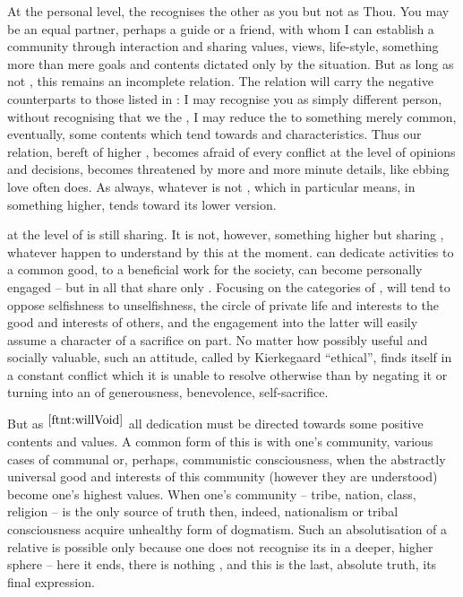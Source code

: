 \pa  %
At the personal level, the  recognises the other as you but
not as Thou.  You may be an equal partner, perhaps a guide or a friend, with
whom I can establish a community through interaction and sharing values, views,
life-style, something more than mere goals and contents dictated only by the
 situation. But as long as not , this remains
an incomplete relation.
The relation will carry the negative counterparts to those listed in
: I may recognise you as simply different person,
without recognising that we  the , I may reduce the
 to something merely common, eventually, some  contents
which tend towards  and  characteristics.  Thus our
relation, bereft of higher , becomes afraid of every conflict at
the level of  opinions and decisions, becomes threatened by more and
more minute details, like ebbing love often does. As always, whatever is not
, which in particular means,  in something
higher, tends toward its lower version.


{} at the level of  is still sharing. It is
not, however,  something higher but sharing , whatever
 happen to understand by this at the moment.  can dedicate 
activities to a common good, to a beneficial work for the society,  can
become personally engaged -- but in all that  share only .  Focusing
on the categories of ,  will tend to oppose selfishness to
unselfishness, the circle of  private life and interests to the good and
interests of others, and the engagement into the latter will easily assume a
character of a sacrifice on  part. No matter how possibly useful and
socially valuable, such an attitude, called by Kierkegaard ``ethical'', finds
itself in a constant conflict which it is unable to resolve otherwise than by
negating it or turning  into an  of 
generousness,  benevolence,  self-sacrifice.

But as $^{\ref{ftnt:willVoid}}$ all 
dedication must be directed 
towards some positive contents and values. 
A common form of this is  with one's 
community, various cases of communal or, perhaps, communistic
consciousness, when  the abstractly universal good and interests of
this community (however they are understood) become one's highest values.  When
one's community -- tribe, nation, 
class, religion -- is the only source of truth then, indeed, nationalism or
tribal consciousness acquire unhealthy form of dogmatism. Such an absolutisation
of a relative is possible only because one does not recognise
its  in a deeper, higher sphere -- here it ends, there is nothing
, and this is the last, absolute truth, its final expression.

